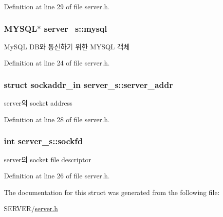 Definition at line 29 of file server.\-h.

\hypertarget{structserver__s_aa7cf2b203a27204e2229a5d0f47e7450}{
\subsubsection[{mysql}]{\setlength{\rightskip}{0pt plus 5cm}M\-Y\-S\-Q\-L$\ast$ server\-\_\-s\-::mysql}}\label{structserver__s_aa7cf2b203a27204e2229a5d0f47e7450}


My\-S\-Q\-L D\-B와 통신하기 위한 M\-Y\-S\-Q\-L 객체 



Definition at line 24 of file server.\-h.

\hypertarget{structserver__s_aa49ed3594b99b1da4de179995dfa553d}{
\subsubsection[{server\-\_\-addr}]{\setlength{\rightskip}{0pt plus 5cm}struct sockaddr\-\_\-in server\-\_\-s\-::server\-\_\-addr}}\label{structserver__s_aa49ed3594b99b1da4de179995dfa553d}


server의 socket address 



Definition at line 28 of file server.\-h.

\hypertarget{structserver__s_a7109ed4db0376f7de840d82c4379099d}{
\subsubsection[{sockfd}]{\setlength{\rightskip}{0pt plus 5cm}int server\-\_\-s\-::sockfd}}\label{structserver__s_a7109ed4db0376f7de840d82c4379099d}


server의 socket file descriptor 



Definition at line 26 of file server.\-h.



The documentation for this struct was generated from the following file\-:\begin{DoxyCompactItemize}
\item 
S\-E\-R\-V\-E\-R/\hyperlink{server_8h}{server.\-h}\end{DoxyCompactItemize}
